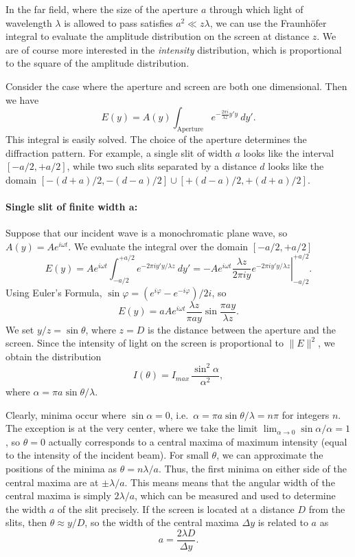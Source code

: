 \documentclass[11pt]{article}
\begin{document}
        In the far field, where the size of the aperture $a$ through which light of wavelength $\lambda$ is allowed to pass satisfies 
        $a^2 \ll z\lambda$, we can use the Fraunh\"ofer integral to evaluate the amplitude distribution on the screen at distance $z$.
        We are of course more interested in the \textit{intensity} distribution, which is proportional to the square of the amplitude
        distribution.

        Consider the case where the aperture and screen are both one dimensional. Then we have
        \[
                E(y) = A(y) \int_{\text{Aperture}} e^{-\frac{2\pi i}{\lambda z}y'y}\:dy'.
        \]
        This integral is easily solved. The choice of the aperture determines the diffraction pattern.
        For example, a single slit of width $a$ looks like the interval $[-a/2, +a/2]$, while two such slits
        separated by a distance $d$ looks like the domain $[-(d + a)/2, -(d - a)/2]\cup [+(d - a)/2, +(d + a)/2]$.

        \paragraph{Single slit of finite width $\boldsymbol{a}$:}
        Suppose that our incident wave is a monochromatic plane wave, so $A(y) = Ae^{i\omega t}$.
        We evaluate the integral over the domain $[-a/2, +a/2]$
        \[
                E(y) = Ae^{i\omega t} \int_{-a/2}^{+a/2} e^{-2\pi i y' y /\lambda z}\:dy' =
                        -Ae^{i\omega t}\left.\frac{\lambda z}{2\pi i y}e^{-2\pi i y' y /\lambda z}\right|_{-a/2}^{+a/2}.
        \]
        Using Euler's Formula, $\sin\varphi = (e^{i\varphi} - e^{-i\varphi})/2i$, so
        \[
                E(y) =  aAe^{i\omega t}\frac{\lambda z}{\pi a y}\sin\frac{\pi a y}{\lambda z}.
        \]
        We set $y /z = \sin\theta$, where $z = D$ is the distance between the aperture and the screen.
        Since the intensity of light on the screen is proportional to $\|E\|^2$, we obtain the distribution
        \[
                I(\theta) = I_{max}\, \frac{\sin^2\alpha}{\alpha^2},
        \]
        where $\alpha = \pi a\sin\theta /\lambda$.

        Clearly, minima occur where $\sin\alpha = 0$, i.e.\ $\alpha = \pi a \sin\theta /\lambda = n\pi$ for integers $n$.
        The exception is at the very center, where we take the limit $\lim_{\alpha \to 0} \sin\alpha /\alpha = 1$, so
        $\theta = 0$ actually corresponds to a central maxima of maximum intensity (equal to the intensity of the incident beam).
        For small $\theta$, we can approximate the positions of the minima as $\theta = n\lambda /a$.
        Thus, the first minima on either side of the central maxima are at $\pm \lambda /a$. This means means that the angular width of the central maxima
        is simply $2\lambda /a$, which can be measured and used to determine the width $a$ of the slit precisely.
        If the screen is located at a distance $D$ from the slits, then $\theta \approx y /D$, so the width of the central maxima $\Delta y$
        is related to $a$ as
        \[
                a = \frac{2\lambda D}{\Delta y}.
        \]
\end{document}
